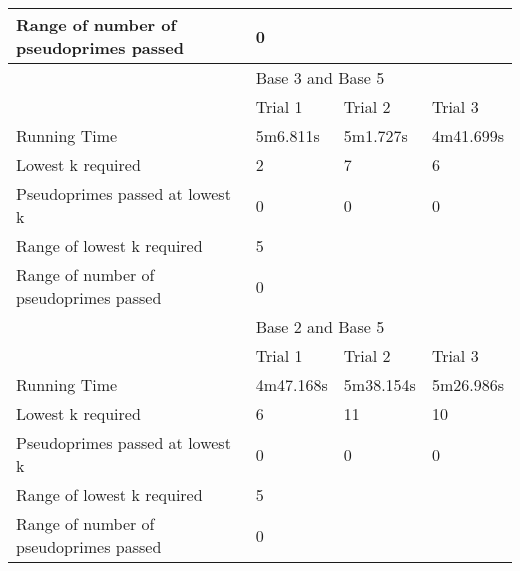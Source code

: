 \documentclass{article}
\begin{document}
\begin{appendices}
\begin{table}[h]
\begin{tabular}{@{}llll@{}}
Range of number of pseudoprimes passed & \multicolumn{3}{l}{0}                 \\\midrule
                                       & \multicolumn{3}{l}{Base 3 and Base 5} \\\midrule
                                       & Trial 1     & Trial 2    & Trial 3    \\
Running Time                           & 5m6.811s    & 5m1.727s   & 4m41.699s  \\
Lowest k required                      & 2           & 7          & 6          \\
Pseudoprimes passed at lowest k        & 0           & 0          & 0          \\\cmidrule(lr){2-4}
Range of lowest k required             & \multicolumn{3}{l}{5}                 \\
Range of number of pseudoprimes passed & \multicolumn{3}{l}{0}                 \\\midrule
                                       & \multicolumn{3}{l}{Base 2 and Base 5} \\\midrule
                                       & Trial 1     & Trial 2    & Trial 3    \\
Running Time                           & 4m47.168s   & 5m38.154s  & 5m26.986s  \\
Lowest k required                      & 6           & 11         & 10         \\
Pseudoprimes passed at lowest k        & 0           & 0          & 0          \\\cmidrule(lr){2-4}
Range of lowest k required             & \multicolumn{3}{l}{5}                 \\
Range of number of pseudoprimes passed & \multicolumn{3}{l}{0}                 \\ \bottomrule
\end{tabular}
\end{table}
\FloatBarrier


\end{appendices}
\end{document}

